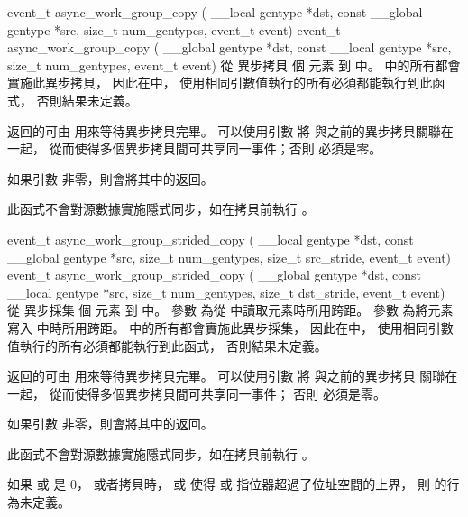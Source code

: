 event_t async_work_group_copy (
	__local gentype *dst,
	const __global gentype *src,
	size_t num_gentypes,
	event_t event)
event_t async_work_group_copy (
	__global gentype *dst,
	const __local gentype *src,
	size_t num_gentypes,
	event_t event)
\stopbuffer
{}
從  異步拷貝  個  元素
到  中。
中的所有都會實施此異步拷貝，
因此在中，
使用相同引數值執行的所有必須都能執行到此函式，
否則結果未定義。

返回的可由  用來等待異步拷貝完畢。
可以使用引數  將  與之前的異步拷貝關聯在一起，
從而使得多個異步拷貝間可共享同一事件；否則  必須是零。

如果引數  非零，則會將其中的返回。

此函式不會對源數據實施隱式同步，如在拷貝前執行 。
\stopbuffer

event_t async_work_group_strided_copy (
	__local gentype *dst,
	const __global gentype *src,
	size_t num_gentypes,
	size_t src_stride,
	event_t event)
event_t async_work_group_strided_copy (
	__global gentype *dst,
	const __local gentype *src,
	size_t num_gentypes,
	size_t dst_stride,
	event_t event)
\stopbuffer
{}
從  異步採集  個  元素
到  中。
參數  為從  中讀取元素時所用跨距。
參數  為將元素寫入  中時所用跨距。
中的所有都會實施此異步採集，
因此在中，
使用相同引數值執行的所有必須都能執行到此函式，
否則結果未定義。

返回的可由  用來等待異步拷貝完畢。
可以使用引數  將  與之前的異步拷貝
關聯在一起，
從而使得多個異步拷貝間可共享同一事件；
否則  必須是零。

如果引數  非零，則會將其中的返回。

此函式不會對源數據實施隱式同步，如在拷貝前執行 。

如果  或  是 0，
或者拷貝時，  或  使得
  或  指位器超過了位址空間的上界，
則  的行為未定義。
\stopbuffer

